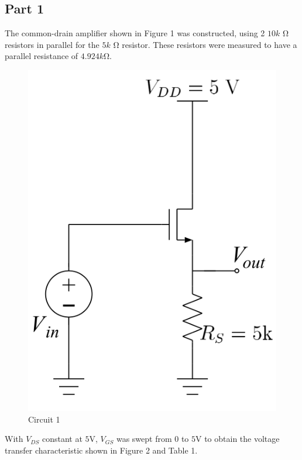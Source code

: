 \subsection{Part 1}
The common-drain amplifier shown in Figure 1 was constructed, using 2 $10k$ \si{\ohm} resistors in parallel for the $5k$ \si{\ohm} resistor.
These resistors were measured to have a parallel resistance of $4.924k$\si{\ohm}.

\FloatBarrier

\begin{figure}[h!]
	\centering
	\includegraphics[scale=0.75]{./images/circuit_1.PNG}
	\caption{Circuit 1}
	\label{fig:circuit_1}
\end{figure}

\FloatBarrier

With $V_{DS}$ constant at $5$\si{\volt}, $V_{GS}$ was swept from 0 to $5$\si{\volt} to obtain the voltage transfer characteristic shown in Figure 2 and Table 1.

\FloatBarrier

